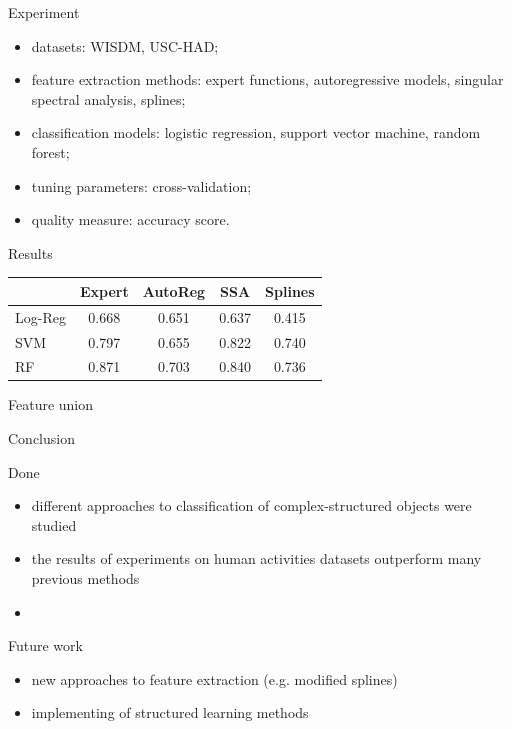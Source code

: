 \documentclass{beamer}
\begin{document}
\begin{frame}{Experiment}
	\begin{itemize}
		\item datasets: WISDM, USC-HAD;
		\item feature extraction methods: expert functions, autoregressive models, singular spectral analysis, splines;
		\item classification models: logistic regression, support vector machine, random forest;
		\item tuning parameters: cross-validation;
		\item quality measure: accuracy score.
	\end{itemize}

\end{frame}
\begin{frame}{Results}
	\begin{table}[]
		\centering
		\label{my-label}
		\begin{tabular}{|l|c|c|c|c|}
			\hline
			 & Expert & AutoReg & SSA & Splines\\
			\hline
			Log-Reg &    0.668    &    0.651     &   0.637  & 0.415  \\
			\hline
			SVM     &    0.797    &     0.655    &   0.822  & 0.740\\
			\hline
			RF      &    0.871    &     0.703    &  0.840 & 0.736 \\
			\hline
		\end{tabular}
	\end{table}

\end{frame}
\begin{frame}{Feature union}

\end{frame}
\begin{frame}{Conclusion}
	\begin{block}{Done}
		\begin{itemize}
			\item different approaches to classification of complex-structured objects were studied
			\item the results of experiments on human activities datasets outperform many previous methods
			\item 
		\end{itemize}
	\end{block}
	\begin{block}{Future work}
		\begin{itemize}
			\item new approaches to feature extraction (e.g. modified splines)
			\item implementing of structured learning methods
		\end{itemize}
	
	\end{block}
\end{frame}
\end{document}
